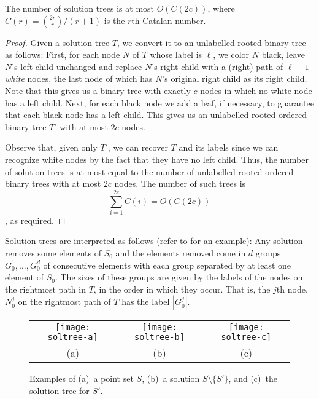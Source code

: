 \documentclass[lotsofwhite]{patmorin}
\begin{document}
\begin{lem}
The number of solution trees is at most $O(C(2c))$, where
$C(r)={2r\choose r}/(r+1)$ is the $r$th Catalan number.
\end{lem}

\begin{proof} Given a solution tree $T$, we convert it to an
unlabelled rooted binary tree as follows: First, for each node $N$ of
$T$ whose label is $\ell$, we color $N$ black, leave $N$'s left child
unchanged and replace $N$'s right child with a (right) path of
$\ell-1$ \emph{white} nodes, the last node of which has $N$'s original
right child as its right child.  Note that this gives us a binary
tree with exactly $c$ nodes in which no white node has a left child.
Next, for each black node we add a leaf, if necessary, to guarantee
that each black node has a left child.  This gives us an unlabelled
rooted ordered binary tree $T'$ with at most $2c$ nodes.

Observe that, given only $T'$, we can recover $T$ and its labels since
we can recognize white nodes by the fact that they have no left child.
Thus, the number of solution trees is at most equal to the number of
unlabelled rooted ordered binary trees with at most $2c$ nodes.  The
number of such trees is 
\[
  \sum_{i=1}^{2c} C(i) = O(C(2c))
\]
\cite{knuth-graham-patashnik},
as required.
\end{proof}

Solution trees are interpreted as follows (refer to
 for an example): Any solution removes some
elements of $S_0$ and the elements removed come in $d$ groups
$G_0^1,\ldots,G_0^d$ of consecutive elements with each group separated
by at least one element of $S_0$.  The sizes of these groups are given
by the labels of the nodes on the rightmost path in $T$, in the order
in which they occur.  That is, the $j$th node, $N_0^j$ on the
rightmost path of $T$ has the label $|G_0^j|$. 

\begin{figure}
\begin{center}
\begin{tabular}{ccc}
\texttt{[image: soltree-a]} & 
\texttt{[image: soltree-b]} &
\texttt{[image: soltree-c]} \\
(a) & (b) & (c)
\end{tabular}
\end{center}
\caption{Examples of (a)~a point set $S$, (b)~a solution
$S\setminus\{S'\}$, and (c)~the solution tree for $S'$.}
\end{figure}
\end{document}
